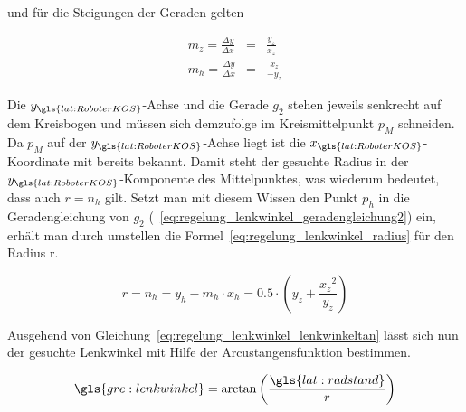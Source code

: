 und für die Steigungen der Geraden gelten

\begin{eqnarray}
 m_z = \frac{\Delta y}{\Delta x} & = & \frac{y_z}{x_z} 	\\
 m_h = \frac{\Delta y}{\Delta x} & = & \frac{x_z}{-y_z}
\end{eqnarray}

Die \( y_{\gls{lat:RoboterKOS}} \)-Achse und die Gerade \( g_2 \) stehen jeweils senkrecht auf dem Kreisbogen und müssen sich demzufolge im Kreismittelpunkt \( p_M \) schneiden. Da \( p_M \) auf der \( y_{\gls{lat:RoboterKOS}} \)-Achse liegt ist die \( x_{\gls{lat:RoboterKOS}} \)-Koordinate mit \grqq{} bereits bekannt. Damit steht der gesuchte Radius in der \( y_{\gls{lat:RoboterKOS}} \)-Komponente des Mittelpunktes, was wiederum bedeutet, dass auch \( r = n_h \) gilt. Setzt man mit diesem Wissen den Punkt \( p_h \) in die Geradengleichung von \( g_2 \) (~\ref{eq:regelung_lenkwinkel_geradengleichung2}) ein, erhält man durch umstellen die Formel~\ref{eq:regelung_lenkwinkel_radius} für den Radius r.

\begin{equation}
r = n_h = y_h - m_h \cdot x_h = 0.5 \cdot \left( y_z + \frac{{x_z}^2}{y_z} \right)
\label{eq:regelung_lenkwinkel_radius}
\end{equation}

Ausgehend von Gleichung~\ref{eq:regelung_lenkwinkel_lenkwinkeltan} lässt sich nun der gesuchte Lenkwinkel mit Hilfe der Arcustangensfunktion bestimmen.

\begin{equation}
\gls{gre:lenkwinkel} = \arctan \left( \frac{\gls{lat:radstand}}{r} \right)
\end{equation}
